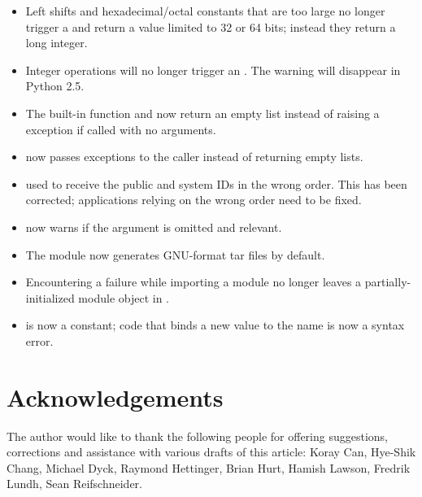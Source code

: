 \documentclass{howto}
\begin{document}
\begin{itemize}

\item Left shifts and hexadecimal/octal constants that are too 
  large no longer trigger a  and return 
  a value limited to 32 or 64 bits; instead they return a long integer.

\item Integer operations will no longer trigger an .
The  warning will disappear in Python 2.5.

\item The  built-in function and 
  now return  an empty list instead of raising a 
  exception if called with no arguments.

\item {} now passes exceptions to the caller
      instead of returning empty lists.

\item {} used to receive the public and
  system IDs in the wrong order.  This has been corrected; applications
  relying on the wrong order need to be fixed.

\item {} now warns if the  
 argument is omitted and relevant.

\item The  module now generates GNU-format tar files
by default.

\item Encountering a failure while importing a module no longer leaves
a partially-initialized module object in .  

\item {} is now a constant; code that binds a new value to 
the name  is now a syntax error.

\end{itemize}


\section{Acknowledgements \label{acks}}

The author would like to thank the following people for offering
suggestions, corrections and assistance with various drafts of this
article: Koray Can, Hye-Shik Chang, Michael Dyck, Raymond Hettinger, 
Brian Hurt, Hamish Lawson, Fredrik Lundh, Sean Reifschneider.
\end{document}
